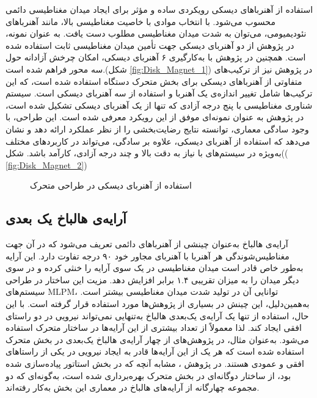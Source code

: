 استفاده از آهنرباهای دیسکی رویکردی ساده و مؤثر برای ایجاد میدان مغناطیسی دائمی محسوب می‌شود. با انتخاب موادی با خاصیت مغناطیسی بالا، مانند آهنرباهای نئودیمیومی، می‌توان به شدت میدان مغناطیسی مطلوب دست یافت. به عنوان نمونه، در پژوهش 
\cite{RN7}
 از دو آهنربای دیسکی جهت تأمین میدان مغناطیسی ثابت استفاده شده است. همچنین در پژوهش 
\cite{RN39}
 با به‌کارگیری ۶ آهنربای دیسکی، امکان چرخش آزادانه حول سه محور فراهم شده است.(شکل
\ref{fig:Disk_Magnet_1})
 در پژوهش 
\cite{RN8}
 نیز از ترکیب‌های متفاوتی از آهنرباهای دیسکی برای بخش متحرک دستگاه استفاده شده است، که این ترکیب‌ها شامل تغییر اندازه‌ی یک آهنربا و استفاده از سه آهنربای دیسکی است. سیستم شناوری مغناطیسی با پنج درجه آزادی که تنها از یک آهنربای دیسکی تشکیل شده است، در پژوهش 
\cite{RN62}
 به عنوان نمونه‌ای موفق از این رویکرد معرفی شده است. این طراحی، با وجود سادگی معماری، توانسته نتایج رضایت‌بخشی را از نظر عملکرد ارائه دهد و نشان می‌دهد که استفاده از آهنربای دیسکی، علاوه بر سادگی، می‌تواند در کاربردهای مختلف به‌ویژه در سیستم‌های با نیاز به دقت بالا و چند درجه آزادی، کارآمد باشد. شکل((
\ref{fig:Disk_Magnet_2})


\begin{figure}[ht]
\centering 
{}
%
\caption{استفاده از آهنربای دیسکی در طراحی متحرک}
\label{fig:Disk_Magnet} %
\end{figure}



\subsection{آرایه‌ی هالباخ یک بعدی}

آرایه‌ی هالباخ
 به‌عنوان چینشی از آهنرباهای دائمی تعریف می‌شود که در آن جهت مغناطیس‌شوندگی هر آهنربا با آهنربای مجاور خود ۹۰ درجه تفاوت دارد. این آرایه به‌طور خاص قادر است میدان مغناطیسی در یک سوی آرایه را خنثی کرده و در سوی دیگر میدان را به میزان تقریبی ۱.۴ برابر افزایش دهد.
مزیت این ساختار در طراحی سیستم‌های MLPM، توانایی آن در تولید شدت میدان مغناطیسی بیشتر است. به‌همین‌دلیل، این چینش در بسیاری از پژوهش‌ها مورد استفاده قرار گرفته است.
با این حال، استفاده از تنها یک آرایه‌ی یک‌بعدی هالباخ به‌تنهایی نمی‌تواند نیرویی در دو راستای افقی ایجاد کند. لذا معمولاً از تعداد بیشتری از این آرایه‌ها در ساختار متحرک استفاده می‌شود. به‌عنوان مثال، در پژوهش‌های 
\cite{RN24,RN27}
 از چهار آرایه‌ی هالباخ یک‌بعدی در بخش متحرک استفاده شده است که هر یک از این آرایه‌ها قادر به ایجاد نیرویی در یکی از راستاهای افقی و عمودی هستند.
در پژوهش 
\cite{RN39}
، مشابه آنچه که در بخش استاتور پیاده‌سازی شده بود، از ساختار دوگانه‌ای در بخش متحرک بهره‌برداری شده است، به‌گونه‌ای که دو مجموعه چهارگانه از آرایه‌های هالباخ در معماری این بخش به‌کار رفته‌اند.

